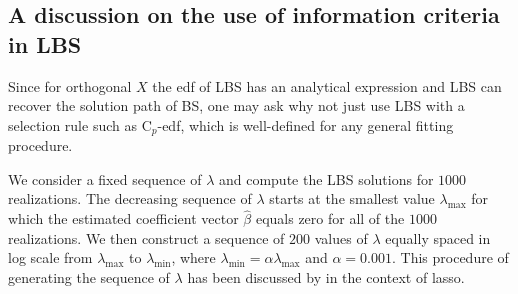 


\subsection{A discussion on the use of information criteria in LBS}
Since for orthogonal $X$ the edf of LBS has an analytical expression and LBS can recover the solution path of BS, one may ask why not just use LBS with a selection rule such as C$_p$-edf, which is well-defined for any general fitting procedure. 

We consider a fixed sequence of $\lambda$ and compute the LBS solutions for $1000$ realizations. The decreasing sequence of $\lambda$ starts at the smallest value $\lambda_{\text{max}}$ for which the estimated coefficient vector $\hat{\beta}$ equals zero for all of the $1000$ realizations. We then construct a sequence of $200$ values of $\lambda$ equally spaced in log scale from $\lambda_{\text{max}}$ to $\lambda_{\text{min}}$, where $\lambda_{\text{min}} = \alpha \lambda_{\text{max}}$ and $\alpha=0.001$. This procedure of generating the sequence of $\lambda$ has been discussed by \citet{Friedman2010} in the context of lasso.


